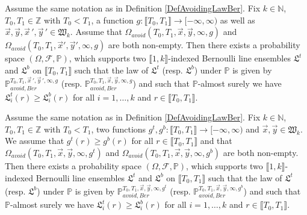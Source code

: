 \begin{lemma}\label{MCLxy} Assume the same notation as in Definition \ref{DefAvoidingLawBer}. Fix $k \in \mathbb{N}$, $T_0, T_1 \in \mathbb{Z}$ with $T_0 < T_1$, a function $g: \llbracket T_0, T_1 \rrbracket  \rightarrow [-\infty, \infty)$ as well as $\vec{x}, \vec{y}, \vec{x}\,', \vec{y}\,' \in \mathfrak{W}_k$. Assume that $\Omega_{avoid}(T_0, T_1, \vec{x}, \vec{y}, \infty,g)$ and $\Omega_{avoid}(T_0, T_1, \vec{x}', \vec{y}', \infty,g)$ are both non-empty. Then there exists a probability space $(\Omega, \mathcal{F}, \mathbb{P})$, which supports two $\llbracket 1, k \rrbracket$-indexed Bernoulli line ensembles $\mathfrak{L}^t$ and $\mathfrak{L}^b$ on $\llbracket T_0, T_1 \rrbracket$ such that the law of $\mathfrak{L}^{t}$ {\big (}resp. $\mathfrak{L}^b${\big )} under $\mathbb{P}$ is given by $\mathbb{P}_{avoid, Ber}^{T_0, T_1, \vec{x}\,', \vec{y}\,', \infty, g}$ {\big (}resp. $\mathbb{P}_{avoid, Ber}^{T_0, T_1, \vec{x}, \vec{y}, \infty, g}${\big )} and such that $\mathbb{P}$-almost surely we have $\mathfrak{L}_i^t(r) \geq \mathfrak{L}^b_i(r)$ for all $i = 1,\dots, k$ and $r \in \llbracket T_0, T_1 \rrbracket$.
\end{lemma}

\begin{lemma}\label{MCLfg} Assume the same notation as in Definition \ref{DefAvoidingLawBer}. Fix $k \in \mathbb{N}$,  $T_0, T_1 \in \mathbb{Z}$ with $T_0 < T_1$, two functions $g^t, g^b: \llbracket T_0, T_1 \rrbracket \rightarrow [-\infty,\infty)$ and $\vec{x}, \vec{y} \in \mathfrak{W}_k$. We assume that $g^t(r) \geq g^b(r)$ for all $r \in \llbracket T_0, T_1 \rrbracket$ and that $\Omega_{avoid}(T_0, T_1, \vec{x}, \vec{y}, \infty,g^t)$ and $\Omega_{avoid}(T_0, T_1, \vec{x}, \vec{y}, \infty,g^b)$ are both non-empty. Then there exists a probability space $(\Omega, \mathcal{F}, \mathbb{P})$, which supports two $\llbracket 1, k \rrbracket$-indexed Bernoulli line ensembles $\mathfrak{L}^t$ and $\mathfrak{L}^b$ on $\llbracket T_0, T_1 \rrbracket$ such that the law of $\mathfrak{L}^{t}$ {\big (}resp. $\mathfrak{L}^b${\big )} under $\mathbb{P}$ is given by $\mathbb{P}_{avoid, Ber}^{T_0, T_1, \vec{x}, \vec{y}, \infty, g^t}$ {\big (}resp. $\mathbb{P}_{avoid, Ber}^{T_0,T_1, \vec{x}, \vec{y}, \infty, g^b}${\big )} and such that $\mathbb{P}$-almost surely we have $\mathfrak{L}_i^t(r) \geq \mathfrak{L}^b_i(r)$ for all $i = 1,\dots, k$ and $r \in \llbracket T_0, T_1 \rrbracket$.
\end{lemma}

